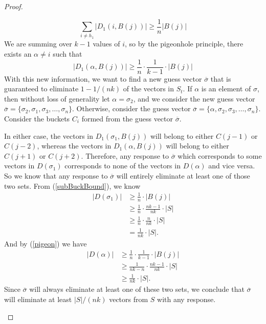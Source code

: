 \documentclass[12pt, a4paper]{article}
\begin{document}
\begin{proof}
\begin{enumerate}[label=\roman*.]
\begin{equation*}
		\sum_{i \neq h_1} |D_1(i,B(j))| \geq \frac{1}{n}|B(j)|
		\end{equation*}
		We are summing over $k-1$ values of $i$, so by the
		pigeonhole principle, there exists an $\alpha \neq i$ such that 
		\begin{equation}\label{pigeon}
		|D_1(\alpha,B(j))| \ge \frac{1}{n}\cdot\frac{1}{k-1}\cdot|B(j)|
		\end{equation}
		With this new information, we want to find a new guess vector $\overline{\sigma}$ that is guaranteed to eliminate $1-1/(nk)$ of the vectors in $S_t$. If $\alpha$ is an element of $\sigma$, then without loss of generality let $\alpha = \sigma_2$, and
		we consider the new guess vector
		$\overline{\sigma}=\{\sigma_2, \sigma_1, \sigma_3, \ldots, \sigma_n\}$.
		Otherwise, consider the guess vector
		$\overline{\sigma}=\{\alpha, \sigma_2, \sigma_3, \ldots, \sigma_n\}$.
		Consider the buckets $C_i$ formed from the guess vector
		$\overline{\sigma}$. 
		
		In either case, the vectors in $D_1(\sigma_1,B(j))$ will belong to either $C(j-1)$ or $C(j-2)$, whereas the vectors in $D_1(\alpha, B(j))$ will belong to either $C(j+1)$ or $C(j+2)$. 
		Therefore, any response to $\overline{\sigma}$ which
		corresponds to some vectors in $D(\sigma_1)$ corresponds to none
		of the vectors in $D(\alpha)$ and vice versa. So we know that any
		response to $\overline{\sigma}$ will entirely eliminate at least one
		of those two sets. From (\ref{subBuckBound}), we know
		\begin{align*}
		|D(\sigma_1)| & \ge \frac{1}{n}\cdot|B(j)|\\
		& \ge \frac{1}{n}\cdot\frac{nk-1}{nk}\cdot|S|\\
		& \ge \frac{1}{n}\cdot\frac{n}{nk}\cdot|S|\\
		& = \frac{1}{nk}\cdot|S|.
		\end{align*}
		And by (\ref{pigeon}) we have
		\begin{align*}
		|D(\alpha)| & \ge\frac{1}{n}\cdot\frac{1}{k-1}\cdot|B(j)|\\
		& \ge \frac{1}{nk-n}\cdot\frac{nk-1}{nk}\cdot|S|\\
		& \ge \frac{1}{nk}\cdot|S|.
		\end{align*}
		Since $\overline{\sigma}$ will always eliminate at least one of
		these two sets, we conclude that $\overline{\sigma}$ will eliminate
		at least $|S|/(nk)$ vectors from $S$ with any response.
		

\end{enumerate}
\end{proof}
\end{document}
